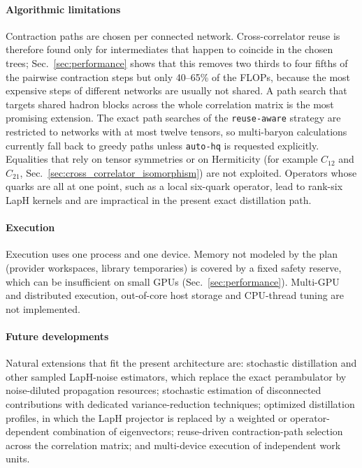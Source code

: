 \documentclass[a4paper,fleqn]{cas-dc}
\begin{document}
\paragraph{Algorithmic limitations}
Contraction paths are chosen per connected network. Cross-correlator reuse is
therefore found only for intermediates that happen to coincide in the chosen
trees; Sec.~\ref{sec:performance} shows that this removes two thirds to four fifths
of the pairwise contraction steps but only 40--65\% of the FLOPs, because the most expensive steps
of different networks are usually not shared. A path search that targets shared
hadron blocks across the whole correlation matrix is the most promising extension.
The exact path searches of the \texttt{reuse-aware} strategy are restricted to
networks with at most twelve tensors, so multi-baryon calculations currently fall
back to greedy paths unless \texttt{auto-hq} is requested explicitly. Equalities
that rely on tensor symmetries or on Hermiticity (for example
\(C_{12}\) and \(C_{21}\), Sec.~\ref{sec:cross_correlator_isomorphism}) are not
exploited. Operators whose quarks are all at one point, such as a local six-quark
operator, lead to rank-six LapH kernels and are impractical in the present exact
distillation path.

\paragraph{Execution}
Execution uses one process and one device. Memory not modeled by the plan
(provider workspaces, library temporaries) is covered by a fixed safety reserve,
which can be insufficient on small GPUs (Sec.~\ref{sec:performance}). Multi-GPU
and distributed execution, out-of-core host storage and CPU-thread tuning are not
implemented.

\paragraph{Future developments}
Natural extensions that fit the present architecture are: stochastic
distillation and other sampled LapH-noise estimators, which replace the exact
perambulator by noise-diluted propagation resources; stochastic estimation of
disconnected contributions with dedicated variance-reduction techniques;
optimized distillation profiles, in which the LapH projector is replaced by a
weighted or operator-dependent combination of eigenvectors; reuse-driven
contraction-path selection across the correlation matrix; and multi-device
execution of independent work units.
\end{document}
